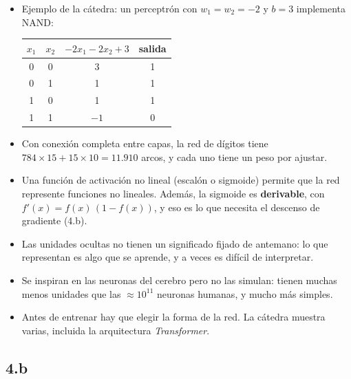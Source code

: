 \documentclass[11pt,a4paper]{article}
\begin{document}
\begin{extras}
\begin{itemize}
  \item Ejemplo de la cátedra: un perceptrón con $w_1 = w_2 = -2$ y $b = 3$ implementa NAND:
  \begin{center}\small
  \begin{tabular}{@{}cc c c@{}}
  \toprule
  $x_1$ & $x_2$ & $-2x_1 - 2x_2 + 3$ & salida \\
  \midrule
  0 & 0 & 3 & 1 \\
  0 & 1 & 1 & 1 \\
  1 & 0 & 1 & 1 \\
  1 & 1 & $-1$ & 0 \\
  \bottomrule
  \end{tabular}
  \end{center}
  \item Con conexión completa entre capas, la red de dígitos tiene $784 \times 15 + 15 \times 10 = 11.910$ arcos, y cada uno tiene un peso por ajustar.
  \item Una función de activación no lineal (escalón o sigmoide) permite que la red represente funciones no lineales. Además, la sigmoide es \textbf{derivable}, con $f'(x) = f(x)\,(1 - f(x))$, y eso es lo que necesita el descenso de gradiente (4.b).
  \item Las unidades ocultas no tienen un significado fijado de antemano: lo que representan es algo que se aprende, y a veces es difícil de interpretar.
  \item Se inspiran en las neuronas del cerebro pero no las simulan: tienen muchas menos unidades que las $\approx 10^{11}$ neuronas humanas, y mucho más simples.
  \item Antes de entrenar hay que elegir la forma de la red. La cátedra muestra varias, incluida la arquitectura \textit{Transformer}.
\end{itemize}
\end{extras}

\subsection{4.b}
\end{document}
